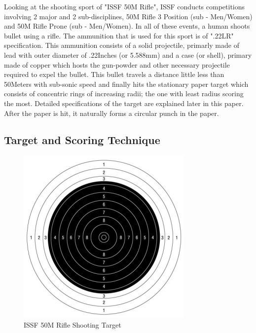 \documentclass[10pt,twocolumn,letterpaper]{article}
\begin{document}
Looking at the shooting sport of "ISSF 50M Rifle", ISSF conducts competitions involving 2 major and 2 sub-disciplines, 50M Rifle 3 Position (sub - Men/Women) and 50M Rifle Prone (sub - Men/Women). In all of these events, a human shoots bullet using a rifle. The ammunition that is used for this sport is of ".22LR" specification. This ammunition consists of a solid projectile, primarly made of lead with outer diameter of .22Inches (or 5.588mm) and a case (or shell), primary made of copper which hosts the gun-powder and other necessary projectile required to expel the bullet. This bullet travels a distance little less than 50Meters with sub-sonic speed and finally hits the stationary paper target which consists of concentric rings of increasing radii; the one with least radius scoring the most. Detailed specifications of the target are explained later in this paper. After the paper is hit, it naturally forms a circular punch in the paper.

\subsection{Target and Scoring Technique}
\begin{figure}[h]
	\centering
	\includegraphics{50mRifleShootingTarget}
	\caption{ISSF 50M Rifle Shooting Target}
\end{figure}
\end{document}
